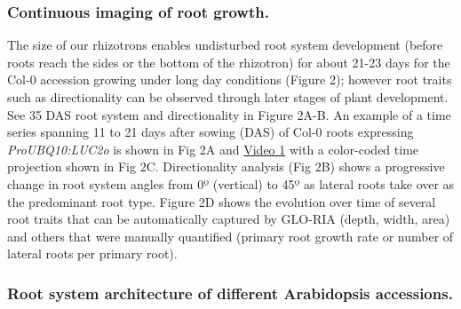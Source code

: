 \documentclass[]{article}
\begin{document}
\subsubsection{Continuous imaging of root
growth.}\label{continuous-imaging-of-root-growth.}

The size of our rhizotrons enables undisturbed root system development
(before roots reach the sides or the bottom of the rhizotron) for about
21-23 days for the Col-0 accession growing under long day conditions
(Figure 2); however root traits such as directionality can be observed
through later stages of plant development. See 35 DAS root system and
directionality in Figure 2A-B. An example of a time series spanning 11
to 21 days after sowing (DAS) of Col-0 roots expressing
\emph{ProUBQ10:LUC2o} is shown in Fig 2A and
\href{https://www.dropbox.com/s/sxjc04o0yj2faif/Video_1.avi?dl=0}{Video
1} with a color-coded time projection shown in Fig 2C. Directionality
analysis (Fig 2B) shows a progressive change in root system angles from
0º (vertical) to 45º as lateral roots take over as the predominant root
type. Figure 2D shows the evolution over time of several root traits
that can be automatically captured by GLO-RIA (depth, width, area) and
others that were manually quantified (primary root growth rate or number
of lateral roots per primary root).

\subsubsection{Root system architecture of different Arabidopsis
accessions.}\label{root-system-architecture-of-different-arabidopsis-accessions.}
\end{document}
